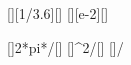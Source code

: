 [\kmph][1/3.6][\mps]
[\centi\meter][e-2][\m]

[]{2*pi*\raX/\vaX}[\s]
[]{\vaX^2/\raX}[\mpss]
[]{\apnX/\ncgX}
